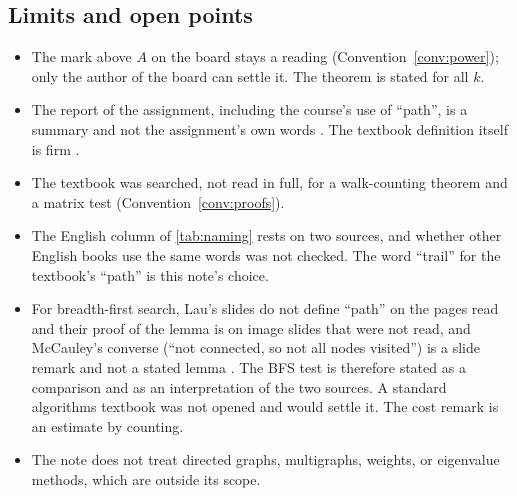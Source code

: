 \subsection{Limits and open points}

\begin{itemize}
\item The mark above $A$ on the board stays a reading
  (Convention~\ref{conv:power}); only the author of the board can settle
  it. The theorem is stated for all $k$.
\item The report of the assignment, including the course's use of ``path'',
  is a summary and not the assignment's own words
  \cite{userstatements}. The textbook definition itself is firm
  \cite[Definition~1.2.13, p.~22]{petrosyan2015graphs}.
\item The textbook was searched, not read in full, for a walk-counting
  theorem and a matrix test (Convention~\ref{conv:proofs}).
\item The English column of \cref{tab:naming} rests on two sources, and
  whether other English books use the same words was not checked. The word
  ``trail'' for the textbook's ``path'' is this note's choice.
\item For breadth-first search, Lau's slides do not define ``path'' on the
  pages read and their proof of the lemma is on image slides that were not
  read, and McCauley's converse (``not connected, so not all nodes
  visited'') is a slide remark and not a stated lemma
  \cite{lau2021bfs,mccauley2025bfs}. The BFS test is therefore stated as a
  comparison and as an interpretation of the two sources. A standard
  algorithms textbook was not opened and would settle it. The cost remark
  is an estimate by counting.
\item The note does not treat directed graphs, multigraphs, weights, or
  eigenvalue methods, which are outside its scope.
\end{itemize}
